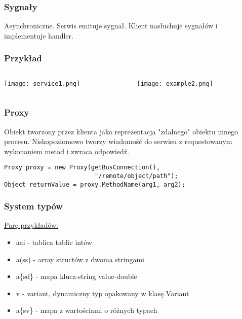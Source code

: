 \begin{frame}
    \frametitle{Sygnały}
    Asynchroniczne. Serwis emituje sygnał.
    Klient nasłuchuje sygnałów i implementuje handler.
\end{frame}


\begin{frame}
    \frametitle{Przykład}
    \begin{columns}
    \begin{column}{0.5\textwidth}
        \begin{center}
            \texttt{[image: service1.png]}
        \end{center}
    \end{column}
    \begin{column}{0.5\textwidth}
        \begin{center}
            \texttt{[image: example2.png]}        
        \end{center}
    \end{column}
\end{columns}
\end{frame}


\begin{frame}[fragile]
    \frametitle{Proxy}
    Obiekt tworzony przez klienta jako reprezentacja
    "zdalnego" obiektu innego procesu. Niskopoziomowo tworzy
    wiadomość do serwisu z requestowanym wykonaniem metod i zwraca
    odpowiedź.

    \begin{flushleft}
        \begin{lstlisting}
Proxy proxy = new Proxy(getBusConnection(),
                         "/remote/object/path");
Object returnValue = proxy.MethodName(arg1, arg2);
        \end{lstlisting}      
    \end{flushleft}

\end{frame}

\begin{frame}
    \frametitle{System typów}
    \href{https://dbus.freedesktop.org/doc/dbus-specification.html}{Parę przykładów:}
    \begin{itemize}
        \item aai - tablica tablic intów \pause
        \item a(ss) - array structów z dwoma stringami \pause
        \item a\{sd\} - mapa klucz-string value-double \pause
        \item v - variant, dynamiczny typ opakowany w klasę Variant \pause
        \item a\{sv\} - mapa z wartościami o różnych typach
    \end{itemize}
\end{frame}





